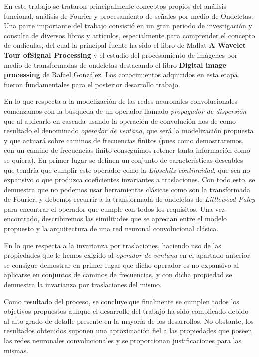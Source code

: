 \medskip
\noindent En este trabajo se trataron principalmente conceptos propios del análisis funcional, análisis de Fourier y procesamiento de señales por medio de Ondeletas. Una parte importante del trabajo consistió en un gran periodo de investigación y consulta de diversos libros y artículos, especialmente para comprender el concepto de ondículas, del cual la principal fuente ha sido el libro de Mallat \textbf{A Wavelet Tour ofSignal Processing} y el estudio del procesamiento de imágenes por medio de transformadas de ondeletas destacando el libro \textbf{Digital image processing} de Rafael González. Los conocimientos adquiridos en esta etapa fueron fundamentales para el posterior desarrollo trabajo.


\medskip

\noindent En lo que respecta a la modelización de las redes neuronales convolucionales comenzamos con la búsqueda de un operador llamado \textit{propagador de dispersión} que al aplicarlo en cascada usando la operación de convolución nos de como resultado el denominado \textit{operador de ventana}, que será la modelización propuesta y que actuará sobre caminos de frecuencias finitos (pues como demostraremos, con un camino de frecuencias finito conseguimos retener tanta información como se quiera). En primer lugar se definen un conjunto de características deseables que tendría que cumplir este operador como la \textit{Lipschitz-continuidad}, que sea no expansivo o que produzca coeficientes invariantes a traslaciones. Con todo esto, se demuestra que no podemos usar herramientas clásicas como son la transformada de Fourier, y debemos recurrir a la transformada de ondeletas de \textit{Littlewood-Paley} para encontrar el operador que cumple con todos los requisitos. Una vez encontrado, describiremos las similitudes que se aprecian entre el modelo propuesto y la arquitectura de una red neuronal convolucional clásica. 

\medskip

\noindent En lo que respecta a la invarianza por traslaciones, haciendo uso de las propiedades que le hemos exigido al \textit{operador de ventana} en el apartado anterior se consigue demostrar en primer lugar que dicho operador es no expansivo al aplicarse en conjuntos de caminos de frecuencias, y con dicha propiedad se demuestra la invarianza por traslaciones del mismo.

\medskip
\noindent Como resultado del proceso, se concluye que finalmente se cumplen todos los objetivos propuestos aunque el desarrollo del trabajo ha sido complicado debido al alto grado de detalle presente en la mayoría de los desarrollos. No obstante, los resultados obtenidos suponen una aproximación fiel a las propiedades que poseen las redes neuronales convolucionales y se proporcionan justificaciones para las mismas.

